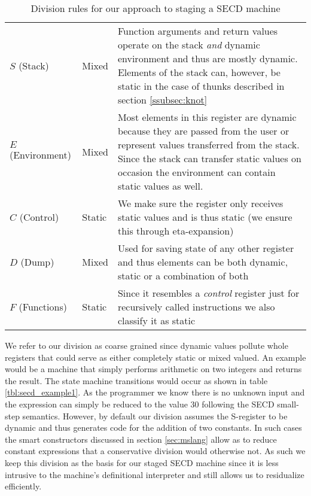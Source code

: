 \documentclass[a4paper,12pt,twoside,openright]{report}
\theoremstyle{definition}
\begin{document}
\begin{table}[!htbp]
  \centering
  \begin{tabular}{|p{3cm}|p{3cm}|p{6cm}|}
 	\hline
 	\thead{SECD Register}	&	\thead{Classification}	&	\thead{Reason}	\\ \hline
	$S$ (Stack)				&	Mixed				&	Function arguments and return values operate on the stack \textit{and} dynamic environment and thus are mostly dynamic. Elements of the stack can, however, be static in the case of thunks described in section \ref{ssubsec:knot} \\ \hline

	$E$ (Environment)		&	Mixed			&	 Most elements in this register are dynamic because they are passed from the user or represent values transferred from the stack. Since the stack can transfer static values on occasion the environment can contain static values as well. \\ \hline

	$C$ (Control)				&	Static				& We make sure the register only receives static values and is thus static (we ensure this through eta-expansion)  \\ \hline

	$D$ (Dump)				&	Mixed				&	Used for saving state of any other register and thus elements can be both dynamic, static or a combination of both \\ \hline

	$F$ (Functions)		&	Static				&	Since it resembles a \textit{control} register just for recursively called instructions we also classify it as static \\

	\hline
  \end{tabular}
  \caption{Division rules for our approach to staging a SECD machine}
  \label{tbl:secd_division}
\end{table}

We refer to our division as coarse grained since dynamic values pollute whole registers that could serve as either completely static or mixed valued. An example would be a machine that simply performs arithmetic on two integers and returns the result. The state machine transitions would occur as shown in table \ref{tbl:secd_example1}. As the programmer we know there is no unknown input and the expression can simply be reduced to the value 30 following the SECD small-step semantics. However, by default our division assumes the S-register to be dynamic and thus generates code for the addition of two constants. In such cases the smart constructors discussed in section \ref{sec:mslang} allow as to reduce constant expressions that a conservative division would otherwise not. As such we keep this division as the basis for our staged SECD machine since it is less intrusive to the machine's definitional interpreter and still allows us to residualize efficiently.
\end{document}
